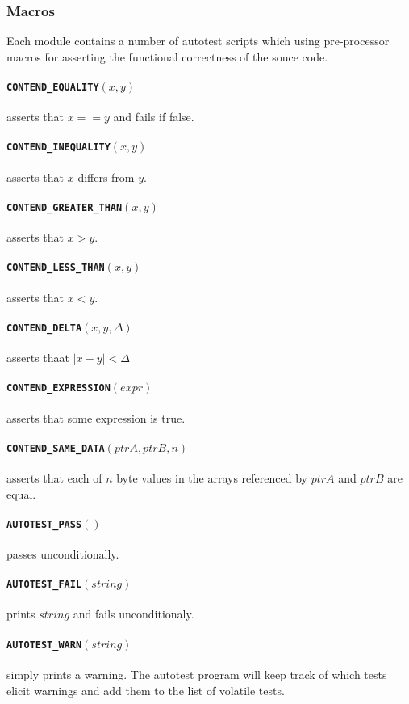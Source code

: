 \documentclass[11pt,twoside]{report}
\begin{document}
\subsubsection{Macros}
Each module contains a number of autotest scripts which using pre-processor
macros for asserting the functional correctness of the souce code.

\paragraph{{\tt CONTEND\_EQUALITY}$(x,y)$} asserts that $x==y$ and fails if
false.
\paragraph{{\tt CONTEND\_INEQUALITY}$(x,y)$} asserts that $x$ differs from
$y$.
\paragraph{{\tt CONTEND\_GREATER\_THAN}$(x,y)$} asserts that $x>y$.
\paragraph{{\tt CONTEND\_LESS\_THAN}$(x,y)$} asserts that $x<y$.
\paragraph{{\tt CONTEND\_DELTA}$(x,y,\Delta)$} asserts thaat $|x-y|<\Delta$
\paragraph{{\tt CONTEND\_EXPRESSION}$(expr)$} asserts that some expression is
true.
\paragraph{{\tt CONTEND\_SAME\_DATA}$(ptrA,ptrB,n)$} asserts that each of $n$
byte values in the arrays referenced by $ptrA$ and $ptrB$ are equal.
\paragraph{{\tt AUTOTEST\_PASS}$()$} passes unconditionally.
\paragraph{{\tt AUTOTEST\_FAIL}$(string)$} prints $string$ and fails
unconditionaly.
\paragraph{{\tt AUTOTEST\_WARN}$(string)$} simply prints a warning.
The autotest program will keep track of which tests elicit warnings and add
them to the list of volatile tests.
\end{document}
